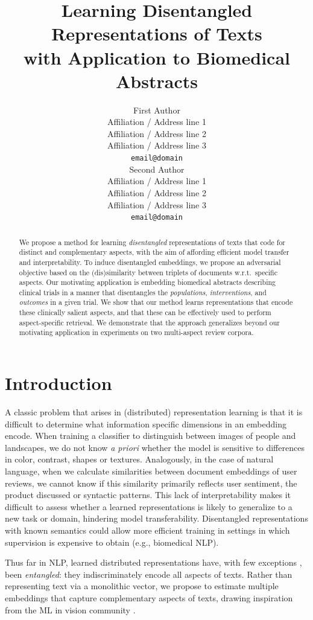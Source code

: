 \documentclass[11pt,a4paper]{article}
\title{Learning Disentangled Representations of Texts \\ with Application to Biomedical Abstracts}
\author{First Author \\
  Affiliation / Address line 1 \\
  Affiliation / Address line 2 \\
  Affiliation / Address line 3 \\
  {\tt email@domain} \\\And
  Second Author \\
  Affiliation / Address line 1 \\
  Affiliation / Address line 2 \\
  Affiliation / Address line 3 \\
  {\tt email@domain} \\}
\date{}
\begin{document}
\maketitle
\begin{abstract}

We propose a method for learning \emph{disentangled} representations of texts that code for distinct and complementary aspects, with the aim of affording efficient model transfer and interpretability. To induce disentangled embeddings, we propose an adversarial objective based on the (dis)similarity between triplets of documents w.r.t.~specific aspects. Our motivating application is embedding biomedical abstracts describing clinical trials in a manner that disentangles the \emph{populations}, \emph{interventions}, and \emph{outcomes} in a given trial. We show that our method learns representations that encode these clinically salient aspects, and that these can be effectively used to perform aspect-specific retrieval. We demonstrate that the approach generalizes beyond our motivating application in experiments on two multi-aspect review corpora. 
\end{abstract}

\section{Introduction}
\vspace{-.5em}

A classic problem that arises in (distributed) representation learning is that it is difficult to determine what information specific dimensions in an embedding encode. When training a classifier to distinguish between images of people and landscapes, we do not know \emph{a priori} whether the model is sensitive to differences in color, contrast, shapes or textures. Analogously, in the case of natural language, when we calculate similarities between document embeddings of user reviews, we cannot know if this similarity primarily reflects user sentiment, the product discussed or syntactic patterns. This lack of interpretability 
makes it difficult to assess whether a learned representations is likely to generalize to a new task or domain, hindering model transferability. Disentangled representations with known semantics could allow more efficient training in settings in which supervision is expensive to obtain (e.g., biomedical NLP).

Thus far in NLP, learned distributed representations have, with few exceptions \cite{ruder2016hierarchical,he-2017,zhang2017aspect}, been \emph{entangled}: they indiscriminately encode all aspects of texts. 
Rather than representing text via a monolithic vector, we propose to estimate multiple embeddings that capture complementary aspects of texts, drawing inspiration from the ML in vision community \cite{whitney2016disentangled,veit2017conditional}.
\end{document}

